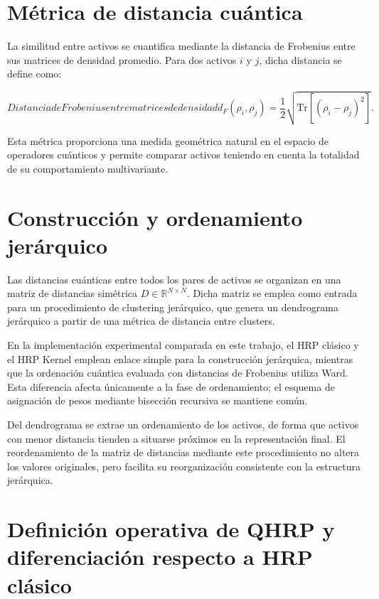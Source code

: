 \section{Métrica de distancia cuántica}
\label{sec:metrica_distancia_cuantica}
La similitud entre activos se cuantifica mediante la distancia de Frobenius entre sus matrices de densidad promedio. Para dos activos $i$ y $j$, dicha distancia se define como:

\begin{equation}[eq:distancia_frobenius_cuantica]{Distancia de Frobenius entre matrices de densidad}
d_F(\rho_i, \rho_j) = \frac{1}{2}
\sqrt{\mathrm{Tr}\left[(\rho_i - \rho_j)^2\right]}.
\end{equation}

Esta métrica proporciona una medida geométrica natural en el espacio de operadores cuánticos y permite comparar activos teniendo en cuenta la totalidad de su comportamiento multivariante.

\section{Construcción y ordenamiento jerárquico}
\label{sec:construccion_ordenamiento}

Las distancias cuánticas entre todos los pares de activos se organizan en una matriz de distancias simétrica $D \in \mathbb{R}^{N \times N}$. Dicha matriz se emplea como entrada para un procedimiento de clustering jerárquico, que genera un dendrograma jerárquico a partir de una métrica de distancia entre clusters.

En la implementación experimental comparada en este trabajo, el HRP clásico y el HRP Kernel emplean enlace simple para la construcción jerárquica, mientras que la ordenación cuántica evaluada con distancias de Frobenius utiliza Ward. Esta diferencia afecta únicamente a la fase de ordenamiento; el esquema de asignación de pesos mediante bisección recursiva se mantiene común.

Del dendrograma se extrae un ordenamiento de los activos, de forma que activos con menor distancia tienden a situarse próximos en la representación final. El reordenamiento de la matriz de distancias mediante este procedimiento no altera los valores originales, pero facilita su reorganización consistente con la estructura jerárquica.

\section{Definición operativa de QHRP y diferenciación respecto a HRP clásico}
\label{sec:qhrp_vs_hrp}


